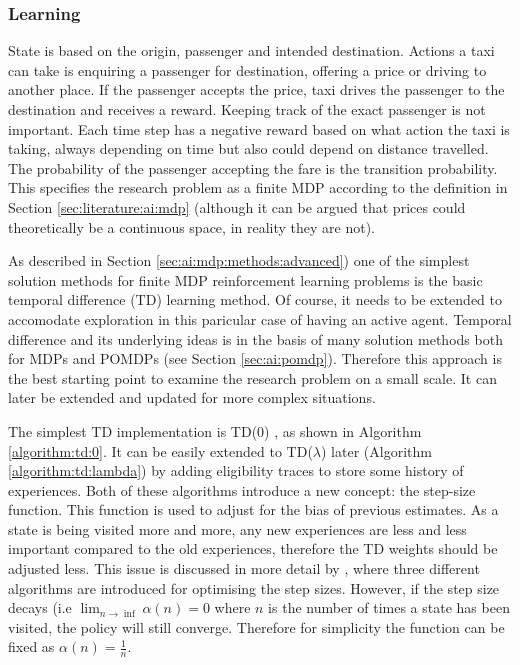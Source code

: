 \subsubsection{Learning}
\label{sec:design:ai}

State is based on the origin, passenger and intended destination. Actions a
taxi can take is enquiring a passenger for destination, offering a price or
driving to another place. If the passenger accepts the price, taxi drives the
passenger to the destination and receives a reward. Keeping track of the exact
passenger is not important. Each time step has a negative reward based on what
action the taxi is taking, always depending on time but also could depend on
distance travelled. The probability of the passenger accepting the fare is the
transition probability. This specifies the research problem as a finite MDP
according to the definition in Section \ref{sec:literature:ai:mdp} (although it
can be argued that prices could theoretically be a continuous space, in reality
they are not).

As described in Section \ref{sec:ai:mdp:methods:advanced}) one of the simplest
solution methods for finite MDP reinforcement learning problems is the basic
temporal difference (TD) learning method. Of course, it needs to be extended to
accomodate exploration in this paricular case of having an active agent.
Temporal difference and its underlying ideas is in the basis of many solution
methods both for MDPs and POMDPs (see Section \ref{sec:ai:pomdp}). Therefore
this approach is the best starting point to examine the research problem on a
small scale. It can later be extended and updated for more complex situations.

The simplest TD implementation is TD(0) \parencite{Russell2010ai+modern}, as
shown in Algorithm \ref{algorithm:td:0}. It can be easily extended to
TD(\(\lambda\)) later (Algorithm \ref{algorithm:td:lambda}) by adding eligibility
traces to store some history of experiences. Both of these algorithms introduce
a new concept: the step-size function. This function is used to adjust for the
bias of previous estimates. As a state is being visited more and more, any new
experiences are less and less important compared to the old experiences,
therefore the TD weights should be adjusted less. This issue is discussed in
more detail by \textcite{Sutton1994ai+stepsize}, where three different
algorithms are introduced for optimising the step sizes. However, if the step
size decays (i.e \(\lim_{n \to \inf}\alpha(n) = 0\) where \(n\) is the number
of times a state has been visited, the policy will still converge. Therefore
for simplicity the function can be fixed as \(\alpha(n)=\frac{1}{n}\).


